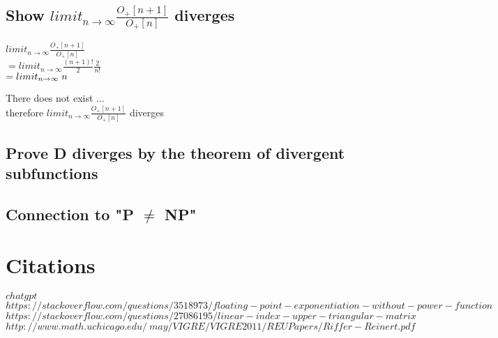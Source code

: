 \documentclass[11pt]{article}
\begin{document}
\subsection{Show $limit_{n \rightarrow \infty}\frac{O_+[n+1]}{O_+[n]}$ diverges}
\begin{center}
$
limit_{n \rightarrow \infty}\frac{O_+[n+1]}{O_+[n]}
$
\\ \vspace{2mm}
$
= limit_{n \rightarrow \infty}\frac{(n+1)!}{2} \frac{2}{n!}
$
\\ \vspace{2mm}
$
= limit_{n \rightarrow \infty}\hspace{1mm} n
$
\end{center}
There does not exist ... \\
therefore $limit_{n \rightarrow \infty}\frac{O_+[n+1]}{O_+[n]}$ diverges



\subsection{Prove D diverges by the theorem of divergent subfunctions}




\subsection{Connection to "P $\neq$ NP"}



\newpage
\section*{Citations}

\rbrack \hspace{1mm} $chatgpt$\\
\rbrack \hspace{1mm} $https://stackoverflow.com/questions/3518973/floating-point-exponentiation-without-power-function$\\
\rbrack \hspace{1mm} $https://stackoverflow.com/questions/27086195/linear-index-upper-triangular-matrix$\\
\rbrack \hspace{1mm} $http://www.math.uchicago.edu/~may/VIGRE/VIGRE2011/REUPapers/Riffer-Reinert.pdf$
\end{document}
